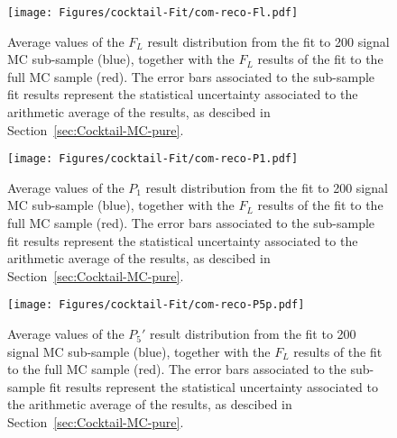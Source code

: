 \begin{figure}[!hbt]
  \centering
  \texttt{[image: Figures/cocktail-Fit/com-reco-Fl.pdf]}
  \caption{Average values of the $F_L$ result distribution from the fit to 200 signal MC sub-sample (blue), together with the $F_L$ results of the fit to the full MC sample (red). The error bars associated to the sub-sample fit results represent the statistical uncertainty associated to the arithmetic average of the results, as descibed in Section~\ref{sec:Cocktail-MC-pure}.}
  \label{fig:sub-samp-FL}
\end{figure}


\begin{figure}[!hbt]
  \centering
  \texttt{[image: Figures/cocktail-Fit/com-reco-P1.pdf]}
  \caption{Average values of the $P_1$ result distribution from the fit to 200 signal MC sub-sample (blue), together with the $F_L$ results of the fit to the full MC sample (red). The error bars associated to the sub-sample fit results represent the statistical uncertainty associated to the arithmetic average of the results, as descibed in Section~\ref{sec:Cocktail-MC-pure}.}
  \label{fig:sub-samp-P1}
\end{figure}

\begin{figure}[!hbt]
  \centering
  \texttt{[image: Figures/cocktail-Fit/com-reco-P5p.pdf]}
  \caption{Average values of the $P_5'$ result distribution from the fit to 200 signal MC sub-sample (blue), together with the $F_L$ results of the fit to the full MC sample (red). The error bars associated to the sub-sample fit results represent the statistical uncertainty associated to the arithmetic average of the results, as descibed in Section~\ref{sec:Cocktail-MC-pure}.}
  \label{fig:sub-samp-P5p}
\end{figure}






